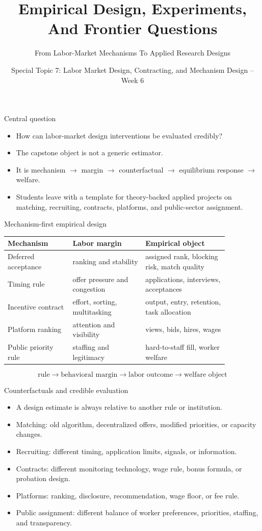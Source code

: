 \documentclass[aspectratio=169,11pt]{beamer}
\title{Empirical Design, Experiments, And Frontier Questions}
\subtitle{From Labor-Market Mechanisms To Applied Research Designs}
\author{Special Topic 7: Labor Market Design, Contracting, and Mechanism Design -- Week 6}
\date{}
\begin{document}
\begin{frame}
  \titlepage
\end{frame}

\begin{frame}{Central question}
\begin{itemize}
    \item How can labor-market design interventions be evaluated credibly?
    \item The capstone object is not a generic estimator.
    \item It is mechanism $\rightarrow$ margin $\rightarrow$ counterfactual $\rightarrow$ equilibrium response $\rightarrow$ welfare.
    \item Students leave with a template for theory-backed applied projects on matching, recruiting, contracts, platforms, and public-sector assignment.
\end{itemize}
\end{frame}

\begin{frame}{Mechanism-first empirical design}
\small
\begin{tabular}{p{0.25\linewidth} p{0.29\linewidth} p{0.32\linewidth}}
\toprule
Mechanism & Labor margin & Empirical object \\
\midrule
Deferred acceptance & ranking and stability & assigned rank, blocking risk, match quality \\
Timing rule & offer pressure and congestion & applications, interviews, acceptances \\
Incentive contract & effort, sorting, multitasking & output, entry, retention, task allocation \\
Platform ranking & attention and visibility & views, bids, hires, wages \\
Public priority rule & staffing and legitimacy & hard-to-staff fill, worker welfare \\
\bottomrule
\end{tabular}
\vspace{0.2cm}
\[
  \text{rule} \rightarrow \text{behavioral margin} \rightarrow \text{labor outcome} \rightarrow \text{welfare object}
\]
\end{frame}

\begin{frame}{Counterfactuals and credible evaluation}
\begin{itemize}
    \item A design estimate is always relative to another rule or institution.
    \item Matching: old algorithm, decentralized offers, modified priorities, or capacity changes.
    \item Recruiting: different timing, application limits, signals, or information.
    \item Contracts: different monitoring technology, wage rule, bonus formula, or probation design.
    \item Platforms: ranking, disclosure, recommendation, wage floor, or fee rule.
    \item Public assignment: different balance of worker preferences, priorities, staffing, and transparency.
\end{itemize}
\end{frame}
\end{document}
